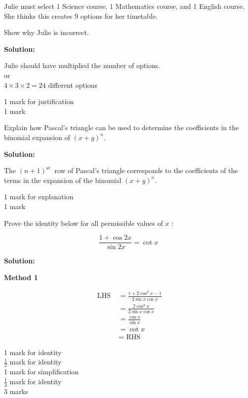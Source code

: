 \documentclass[12pt,addpoints,answers]{exam}
\begin{document}
\begin{questions}
Julie must select 1 Science course, 1 Mathematics course, and 1 English course. She thinks this creates 9 options for her timetable.

Show why Julie is incorrect.
\begin{solution}
\textbf{Solution:}\par
Julie should have multiplied the number of options.\\
or\\
$4 \times 3 \times 2=24$ different options

1 mark for justification\\
1 mark
\end{solution}

\question
\leavevmode
Explain how Pascal's triangle can be used to determine the coefficients in the binomial expansion of $(x+y)^{n}$.
\begin{solution}
\textbf{Solution:}\par
The $(n+1)^{\text {st }}$ row of Pascal's triangle corresponds to the coefficients of the terms in the expansion of the binomial $(x+y)^{n}$.

1 mark for explanation\\
1 mark
\end{solution}

\question
\leavevmode
Prove the identity below for all permissible values of $x$ :

$$
\frac{1+\cos 2 x}{\sin 2 x}=\cot x
$$
\begin{solution}
\textbf{Solution:}\par

\textbf{Method 1}\par
$$
\begin{aligned}
\text { LHS } & =\frac{1+2 \cos ^{2} x-1}{2 \sin x \cos x} \\
& =\frac{2 \cos ^{2} x}{2 \sin x \cos x} \\
& =\frac{\cos x}{\sin x} \\
& =\cot x \\
& =\text { RHS }
\end{aligned}
$$

1 mark for identity\\
$\frac{1}{2}$ mark for identity\\
1 mark for simplification\\
$\frac{1}{2}$ mark for identity\\
3 marks



\end{solution}
\end{questions}
\end{document}
